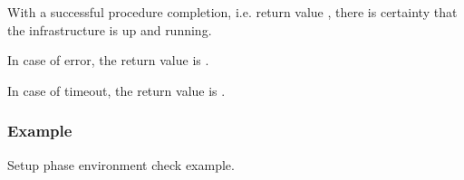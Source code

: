 With a successful procedure completion, i.e. return value
\GASPISUCC{}, there is certainty that the 
infrastructure is up and running.

In case of error, the return value is \GASPIGERR{}. 

In case of timeout, the return value is \GASPITIME{}.

\subsubsection{Example}

Setup phase environment check example.